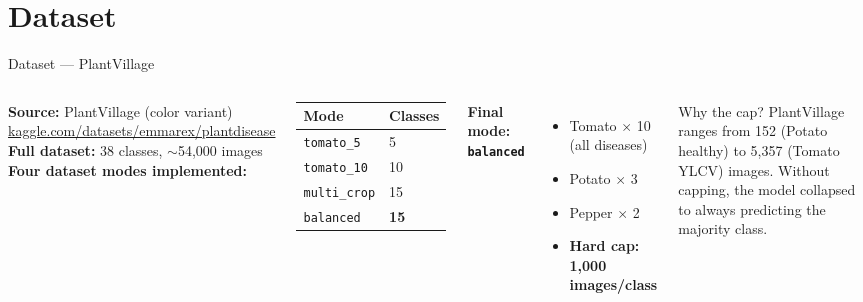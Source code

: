 \documentclass[aspectratio=169]{beamer}
\begin{document}
\section{Dataset}

\begin{frame}{Dataset — PlantVillage}
  \begin{columns}
      \textbf{Source:} PlantVillage (color variant)\\
      \small\url{kaggle.com/datasets/emmarex/plantdisease}\\[0.3cm]
      \textbf{Full dataset:} 38 classes, $\sim$54,000 images\\[0.3cm]
      \textbf{Four dataset modes implemented:}
      \begin{center}
      \begin{tabular}{ll}
        \toprule
        Mode & Classes \\
        \midrule
        \texttt{tomato\_5}   & 5  \\
        \texttt{tomato\_10}  & 10 \\
        \texttt{multi\_crop} & 15 \\
        \texttt{balanced}    & \textbf{15} \\
        \bottomrule
      \end{tabular}
      \end{center}
      \textbf{Final mode: \texttt{balanced}}
      \begin{itemize}
        \item Tomato $\times$ 10 (all diseases)
        \item Potato $\times$ 3
        \item Pepper $\times$ 2
        \item \textbf{Hard cap: 1,000 images/class}
      \end{itemize}
      \vspace{0.2cm}
      \begin{alertblock}{Why the cap?}
        PlantVillage ranges from 152 (Potato healthy) to 5,357 (Tomato YLCV) images. Without capping, the model collapsed to always predicting the majority class.
      \end{alertblock}
  \end{columns}
\end{frame}
\end{document}
